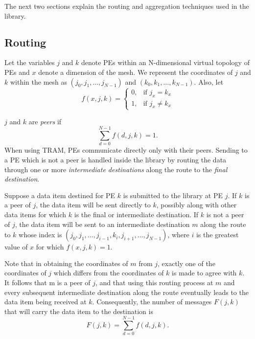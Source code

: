
The next two sections explain the routing and aggregation techniques
used in the library.

\subsection{Routing}

Let the variables $j$ and $k$ denote PEs within an N-dimensional
virtual topology of PEs and $x$ denote a dimension of the mesh. We
represent the coordinates of $j$ and $k$ within the mesh as $\left
(j_0, j_1, \ldots, j_{N-1} \right) $ and $ \left (k_0, k_1, \ldots,
k_{N-1} \right) $.  Also, let
\[
f(x, j, k) =
\begin{cases}
0, & \text{if } j_x = k_x \\
1, & \text{if } j_x \ne k_x
\end{cases}
\]

$j$ and $k$ are \emph{peers} if
\[
\sum_{d=0}^{N-1} f(d, j, k) = 1 .
\]
When using TRAM, PEs communicate directly only with their
peers. Sending to a PE which is not a peer is handled inside the
library by routing the data through one or more \emph{intermediate
  destinations} along the route to the \emph{final destination}.

Suppose a data item destined for PE $k$ is submitted to the library at
PE $j$. If $k$ is a peer of $j$, the data item will be sent directly
to $k$, possibly along with other data items for which $k$ is the
final or intermediate destination.  If $k$ is not a peer of $j$, the
data item will be sent to an intermediate destination $m$ along the
route to $k$ whose index is $\left (j_0, j_1, \ldots, j_{i-1}, k_i,
j_{i+1}, \ldots, j_{N-1} \right)$, where $i$ is the greatest value of
$x$ for which $f(x, j, k) = 1$.

Note that in obtaining the coordinates of $m$ from $j$, exactly one of
the coordinates of $j$ which differs from the coordinates of $k$ is
made to agree with $k$. It follows that m is a peer of $j$, and that
using this routing process at $m$ and every subsequent intermediate
destination along the route eventually leads to the data item being
received at $k$. Consequently, the number of messages $F(j, k)$ that
will carry the data item to the destination is
\[
F(j,k) = \sum_{d=0}^{N-1}f(d, j, k) .
\]

